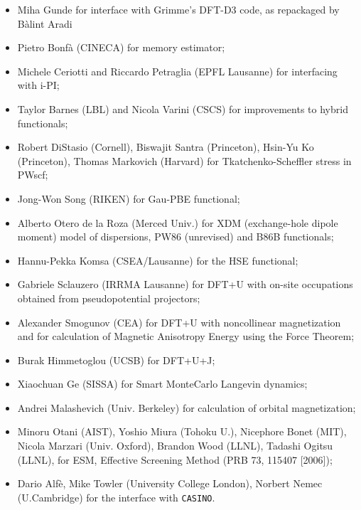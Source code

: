 \documentclass[12pt,a4paper]{article}
\begin{document}
\begin{itemize}
  \item Miha Gunde for interface with Grimme's DFT-D3 code, as
	repackaged by Bàlint Aradi
  \item Pietro Bonf\`a (CINECA) for memory estimator;
  \item Michele Ceriotti and Riccardo Petraglia (EPFL Lausanne) for
        interfacing with i-PI;
  \item Taylor Barnes (LBL) and Nicola Varini (CSCS) for improvements
        to hybrid functionals;
  \item Robert DiStasio (Cornell), Biswajit Santra (Princeton),
        Hsin-Yu Ko (Princeton), Thomas Markovich (Harvard) for
        Tkatchenko-Scheffler stress in PWscf;
  \item Jong-Won Song (RIKEN) for Gau-PBE functional;
  \item Alberto Otero de la Roza (Merced Univ.) for XDM (exchange-hole 
        dipole moment) model of dispersions, PW86 (unrevised) and B86B
        functionals;
  \item Hannu-Pekka Komsa (CSEA/Lausanne) for the HSE functional;
  \item Gabriele Sclauzero (IRRMA Lausanne) for DFT+U
        with on-site occupations obtained from pseudopotential projectors;
  \item Alexander Smogunov (CEA) for DFT+U with noncollinear magnetization
        and for calculation of Magnetic Anisotropy Energy using the Force
        Theorem;
  \item Burak Himmetoglou (UCSB) for DFT+U+J;
  \item Xiaochuan Ge (SISSA) for Smart MonteCarlo Langevin dynamics;
  \item Andrei Malashevich (Univ. Berkeley) for calculation of orbital
        magnetization;
  \item Minoru Otani (AIST), Yoshio Miura (Tohoku U.), 
        Nicephore Bonet (MIT), Nicola Marzari (Univ. Oxford), 
        Brandon Wood (LLNL), Tadashi Ogitsu (LLNL), for ESM,
        Effective Screening Method (PRB 73, 115407 [2006]);
  \item Dario Alf\`e, Mike Towler (University College London), 
        Norbert Nemec (U.Cambridge) for the interface with \texttt{CASINO}.
\end{itemize}

\end{document}
